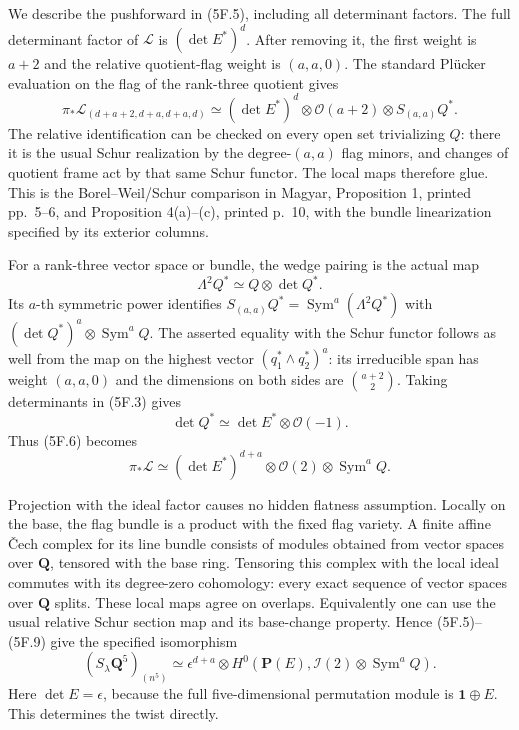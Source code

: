 \documentclass[
  10pt,
]{article}
\begin{document}
We describe the pushforward in (5F.5), including all determinant
factors. The full determinant factor of \(\mathcal L\) is
\((\det E^*)^d\). After removing it, the first weight is \(a+2\) and the
relative quotient-flag weight is \((a,a,0)\). The standard Plücker
evaluation on the flag of the rank-three quotient gives \[
\pi_*\mathcal L_{(d+a+2,d+a,d+a,d)}
\simeq (\det E^*)^d\otimes\mathcal O(a+2)
                  \otimes S_{(a,a)}Q^*.
\tag{5F.6}
\] The relative identification can be checked on every open set
trivializing \(Q\): there it is the usual Schur realization by the
degree-\((a,a)\) flag minors, and changes of quotient frame act by that
same Schur functor. The local maps therefore glue. This is the
Borel--Weil/Schur comparison in Magyar, Proposition 1, printed pp.~5--6,
and Proposition 4(a)--(c), printed p.~10, with the bundle linearization
specified by its exterior columns.

For a rank-three vector space or bundle, the wedge pairing is the actual
map \[
\Lambda^2Q^*\simeq Q\otimes\det Q^*.
\tag{5F.7}
\] Its \(a\)-th symmetric power identifies
\(S_{(a,a)}Q^*=\operatorname{Sym}^a(\Lambda^2Q^*)\) with
\((\det Q^*)^a\otimes\operatorname{Sym}^aQ\). The asserted equality with
the Schur functor follows as well from the map on the highest vector
\((q_1^*\wedge q_2^*)^a\): its irreducible span has weight \((a,a,0)\)
and the dimensions on both sides are \(\binom{a+2}{2}\). Taking
determinants in (5F.3) gives \[
\det Q^*\simeq\det E^*\otimes\mathcal O(-1).
\tag{5F.8}
\] Thus (5F.6) becomes \[
\pi_*\mathcal L\simeq
(\det E^*)^{d+a}\otimes\mathcal O(2)\otimes\operatorname{Sym}^aQ.
\tag{5F.9}
\]

Projection with the ideal factor causes no hidden flatness assumption.
Locally on the base, the flag bundle is a product with the fixed flag
variety. A finite affine Čech complex for its line bundle consists of
modules obtained from vector spaces over \(\mathbf Q\), tensored with
the base ring. Tensoring this complex with the local ideal commutes with
its degree-zero cohomology: every exact sequence of vector spaces over
\(\mathbf Q\) splits. These local maps agree on overlaps. Equivalently
one can use the usual relative Schur section map and its base-change
property. Hence (5F.5)--(5F.9) give the specified isomorphism \[
\boxed{
(S_\lambda\mathbf Q^5)_{(n^5)}
\simeq \epsilon^{d+a}\otimes
H^0(\mathbf P(E),\mathcal I(2)\otimes\operatorname{Sym}^aQ).}
\tag{5F.10}
\] Here \(\det E=\epsilon\), because the full five-dimensional
permutation module is \(\mathbf1\oplus E\). This determines the twist
directly.
\end{document}
